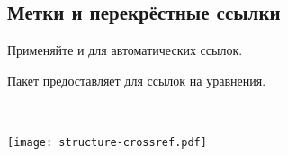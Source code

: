 \documentclass{beamer}
\begin{document}
\subsection{Метки и перекрёстные ссылки}
\begin{frame}[fragile]{\insertsubsection}
\vspace{-2ex}
\begin{itemize}{\small
\item Применяйте  и  для автоматических ссылок.
\item Пакет  предоставляет  для ссылок на уравнения.
}\end{itemize}
\begin{minipage}{0.55\linewidth}
\end{minipage}~~%
\begin{minipage}{0.45\linewidth}
\texttt{[image: structure-crossref.pdf]}
\end{minipage}
\end{frame}

\end{document}
